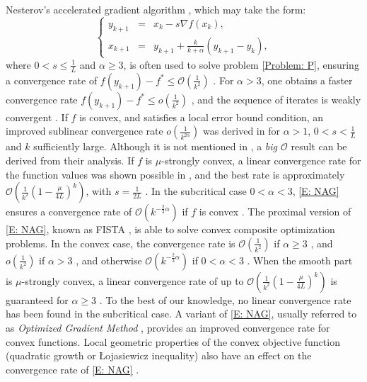 \documentclass[onefignum,onetabnum]{siamart220329}
\begin{document}
Nesterov's accelerated gradient algorithm \cite{Nesterov_1983}, which may take the form:
\begin{equation}\label{E: NAG}\tag{NAG}
\left\{
\begin{array}{rcl}
y_{k+1} &=& x_k - s \nabla f(x_k),\\
x_{k+1} &=& y_{k+1} + \frac{k}{k+\alpha}(y_{k+1}-y_k),
\end{array}
\right.
\end{equation}
where $0<s\le \frac{1}{L}$ and $\alpha\ge 3$, is often used to solve problem \eqref{Problem: P}, ensuring a convergence rate of $f(y_{k+1}) - f^* \le \mathcal{O}\left( \frac{1}{k^2} \right)$ \cite{Nesterov_1983}. For $\alpha > 3$, one obtains a faster convergence rate $f(y_{k+1}) - f^* \le o\left( \frac{1}{k^2} \right)$ \cite{Attouch_2016}, and the sequence of iterates is weakly convergent \cite{Chambolle_2015}. If $f$ is convex, and satisfies a local error bound condition, an improved sublinear convergence rate $o\left( \frac{1}{k^{2\alpha}} \right)$ was derived in \cite{Liu_2024} for $\alpha>1$, $0<s<\frac{1}{L}$ and $k$ sufficiently large. Although it is not mentioned in \cite{Liu_2024}, a {\it big $\mathcal{O}$} result can be derived from their analysis. If $f$ is $\mu$-strongly convex, a linear convergence rate for the function values was shown possible in \cite{Shi_2024}, and the best rate is approximately $\mathcal{O}\left( \frac{1}{k^2}\left( 1 - \frac{\mu}{4L} \right)^k \right)$, with $s=\frac{1}{2L}$ \cite{Bao_2023}. In the subcritical case $0<\alpha<3$, \eqref{E: NAG} ensures a convergence rate of $\mathcal{O}\left( k^{-\frac{2}{3}\alpha} \right)$ if $f$ is convex \cite{Attouch_2019,Aujol_2020}. The proximal version of \eqref{E: NAG}, known as FISTA \cite{Beck_2009}, is able to solve convex composite optimization problems. In the convex case, the convergence rate is $\mathcal{O}\left( \frac{1}{k^2} \right)$ if $\alpha\ge 3$ \cite{Beck_2009}, and $o\left( \frac{1}{k^2} \right)$ if $\alpha>3$ \cite{Attouch_2016}, and otherwise $\mathcal{O}\left( k^{-\frac{2}{3}\alpha} \right)$ if $0<\alpha<3$ \cite{Attouch_2019,Aujol_2020}. When the smooth part is $\mu$-strongly convex, a linear convergence rate of up to $\mathcal{O}\left( \frac{1}{k^2}\left( 1 - \frac{\mu}{4L} \right)^k \right)$ is guaranteed for $\alpha\ge 3$ \cite{Shi_2024,Bao_2023}. To the best of our knowledge, no linear convergence rate has been found in the subcritical case. A variant of \eqref{E: NAG}, usually referred to as {\it Optimized Gradient Method} \cite{Drori_2014,Kim_2016,Kim_2017,Park_2023}, provides an improved convergence rate for convex functions. Local geometric properties of the convex objective function (quadratic growth or \L ojasiewicz inequality) also have an effect on the convergence rate of \eqref{E: NAG} \cite{Aujol_2021}.        
\end{document}
